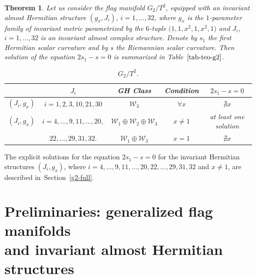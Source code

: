 \documentclass[pdftex]{sigma}%
\numberwithin{equation}{section}
\newtheorem{Theorem}{Theorem}[section]
\begin{document}
\begin{Theorem} \label{teo-g2-t2}
Let us consider the flag manifold $G_2/T^2$, equipped with an invariant almost Hermitian structure $(g_x,J_i)$, $i=1,\ldots, 32$, where $g_x$ is the $1$-parameter family of invariant metric parametrized by the $6$-tuple $\big(1,1,x^{2}, 1, x^{2},1 \big)$ and $J_i$, $i=1,\ldots, 32$ is an invariant almost complex structure. Denote by $s_1$ the first Hermitian scalar curvature and by $s$ the Riemannian scalar curvature. Then solution of the equation $2s_1-s=0$ is summarized in Table~$\ref{tab-teo-g2}$.

\begin{table}[h] \setlength{\tabcolsep}{4.5pt}
\renewcommand{\arraystretch}{1.2}
\centering
\caption{$G_2/T^2$.} \label{tab-teo-g2}
\begin{tabular}{c|c|c|c|c}
\hline
 & $J_i$ &GH Class & Condition & $2s_{1}-s=0$ \\
\hline
$(J_{i},g_x)$ & $i=1,2,3,10,21,30$ & $\mathcal{W}_{3}$ & $\forall x$ & $\nexists x$ \\
\hline
$(J_{i},g_x)$ & $i=4,\ldots,9,11,\ldots,20, $ & $\mathcal{W}_{1}\oplus \mathcal{W}_{2}\oplus\mathcal{W}_{3}$ & $x\neq1$ & at least one solution \\
 & $22,\ldots,29,31,32. $ & $\mathcal{W}_{1}\oplus\mathcal{W}_{3}$ & $x=1$ & $\nexists x$ \\
\hline
\end{tabular}
\end{table}
\end{Theorem}

\begin{Remark}
The explicit solutions for the equation $2s_{1}-s=0$ for the invariant Hermitian structures $(J_i,g_x)$, where $i=4,\ldots,9,11,\ldots,20, 22,\ldots,29,31,32$ and $x\neq 1$, are described in~Section~\ref{g2-full}.
\end{Remark}

\section[Preliminaries: generalized flag manifolds and invariant almost Hermitian structures] {Preliminaries: generalized flag manifolds \\and invariant almost Hermitian structures} \label{section-prelim}
\end{document}
